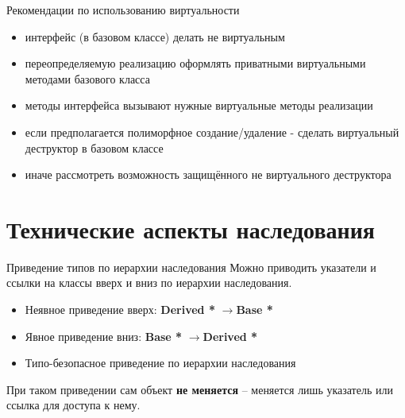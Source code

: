 \documentclass[unknownkeysallowed,xcolor=table]{beamer}
\newcommand{\rarr}{$\rightarrow$}
\begin{document}
\begin{frame}{Рекомендации по использованию виртуальности}
  \begin{itemize}
    \item интерфейс (в базовом классе) делать не виртуальным \vspace{0.5em}
    \item переопределяемую реализацию оформлять приватными виртуальными методами базового класса \vspace{0.5em}
    \item методы интерфейса вызывают нужные виртуальные методы реализации \vspace{0.5em}
    \item если предполагается полиморфное создание/удаление - сделать виртуальный деструктор в базовом классе \vspace{0.5em}
    \item иначе рассмотреть возможность защищённого не виртуального деструктора
  \end{itemize}
\end{frame}

\section{Технические аспекты наследования}

\begin{frame}{Приведение типов по иерархии наследования}
  Можно приводить указатели и ссылки на классы вверх и вниз по иерархии наследования.

  \vspace{1em}

  \begin{itemize}
    \item Неявное приведение вверх: \textbf{Derived *} \rarr \textbf{Base *} \vspace{0.5em}
    \item Явное приведение вниз: \textbf{Base *} \rarr \textbf{Derived *} \vspace{0.5em}
    \item Типо-безопасное приведение по иерархии наследования
  \end{itemize}

  \vspace{1em}

  При таком приведении сам объект \textbf{не меняется} -- меняется лишь указатель или ссылка для доступа к нему.
\end{frame}
\end{document}
